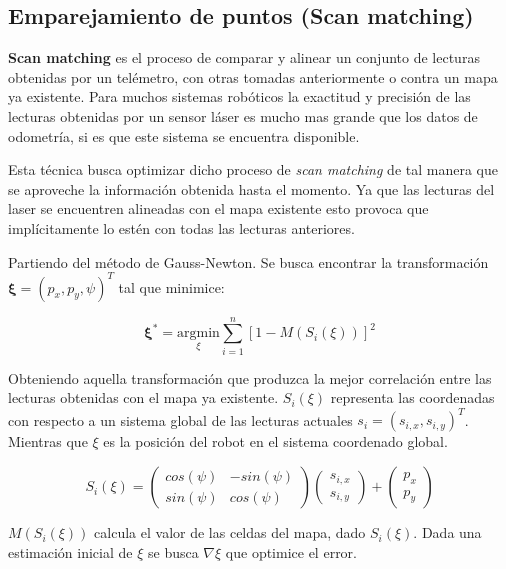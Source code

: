 \documentclass[10pt,a4paper]{article}
\begin{document}
\subsection{Emparejamiento de puntos (Scan matching)}

\textbf{Scan matching} es el proceso de comparar y alinear un conjunto de lecturas obtenidas por un telémetro, con otras tomadas anteriormente o contra un mapa ya existente. Para muchos sistemas robóticos la exactitud y precisión de las lecturas obtenidas por un sensor láser es mucho mas grande que los datos de odometría, si es que este sistema se encuentra disponible.

Esta técnica busca optimizar dicho proceso de \emph{scan matching} de tal manera que se aproveche la información obtenida hasta el momento.  Ya que las lecturas del laser se encuentren alineadas con el mapa existente esto provoca que implícitamente lo estén con todas las lecturas anteriores.

Partiendo del método de Gauss-Newton. Se busca encontrar la transformación  $ \boldsymbol{\xi} = (p_{x}, p_{y}, \psi)^{T} $ tal que minimice:

\begin{equation}
\label{eq:eAsterisk}
	\boldsymbol{\xi}^{*} = 
		\underset{\xi}{\mathrm{argmin}} 
 		\sum_{i=1}^{n} [1 - M(S_{i}(\xi))]^{2}
\end{equation}

Obteniendo aquella transformación que produzca la mejor correlación entre las lecturas obtenidas con el mapa ya existente. $ S_{i}(\xi) $ representa las coordenadas con respecto a un sistema global de las lecturas actuales  $ s_{i} = (s_{i,x}, s_{i,y})^{T} $. Mientras que $ \xi $ es la posición del robot en el sistema coordenado global.

\begin{equation}
\label{eq:SiE}
	S_{i}(\xi) = 
		\begin{pmatrix}
			cos(\psi) & -sin(\psi) \\
			sin(\psi) & cos(\psi)	
		\end{pmatrix}
		\begin{pmatrix}
			s_{i,x} \\ s_{i,y}
		\end{pmatrix} 
		+
		\begin{pmatrix}
			p_{x} \\ p_{y}
		\end{pmatrix}				
\end{equation}

$ M(S_{i}(\xi)) $ calcula el valor de las celdas del mapa, dado $ S_{i}(\xi) $. Dada una estimación inicial de $ \xi $ se busca $ \nabla\xi $ que optimice el error.
\end{document}
